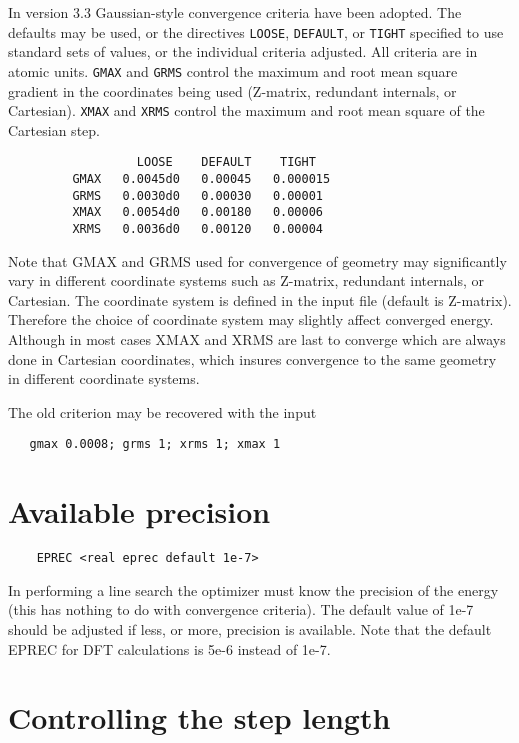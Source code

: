  In version 3.3 Gaussian-style convergence criteria have been adopted.
The defaults may be used, or the directives \verb+LOOSE+,
\verb+DEFAULT+, or \verb+TIGHT+ specified to use standard sets of
values, or the individual criteria adjusted.  All criteria are in
atomic units.
\verb+GMAX+ and \verb+GRMS+ control the maximum and root mean square
gradient in the coordinates being used (Z-matrix, redundant internals,
or Cartesian).  \verb+XMAX+ and \verb+XRMS+ control the maximum and
root mean square of the Cartesian step.

\begin{verbatim}
                  LOOSE    DEFAULT    TIGHT
         GMAX   0.0045d0   0.00045   0.000015   
         GRMS   0.0030d0   0.00030   0.00001
         XMAX   0.0054d0   0.00180   0.00006
         XRMS   0.0036d0   0.00120   0.00004
\end{verbatim}

 Note that GMAX and GRMS used for convergence of geometry may significantly vary in 
different coordinate systems such as Z-matrix, redundant internals, or Cartesian. 
The coordinate system is defined in the input file (default is Z-matrix). 
Therefore the choice of coordinate system may slightly affect converged energy. 
Although in most cases XMAX and XRMS are last to converge which are always done 
in Cartesian coordinates, which insures convergence to the same geometry in 
different coordinate systems.


The old criterion may be recovered with the input
\begin{verbatim}
   gmax 0.0008; grms 1; xrms 1; xmax 1
\end{verbatim}

\section{Available precision}

\begin{verbatim}
    EPREC <real eprec default 1e-7>
\end{verbatim}

In performing a line search the optimizer must know the
precision of the energy (this has nothing to
do with convergence criteria).  The default value
of 1e-7 should be adjusted if less, or more, precision
is available.  Note that the default EPREC for DFT
calculations is 5e-6 instead of 1e-7.

\section{Controlling the step length}


